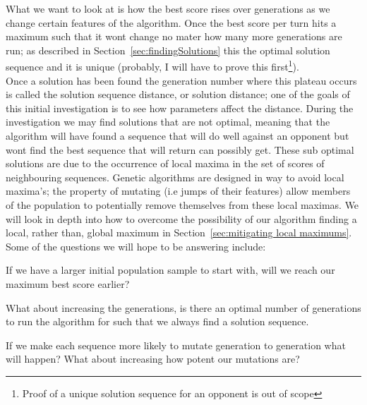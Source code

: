 
What we want to look at is how the best score rises over generations as we change certain features of the algorithm. 
Once the best score per turn hits a maximum such that it wont change no mater how many more generations are run; as described in Section~\ref{sec:findingSolutions} this the optimal solution sequence and it is unique (probably, I will have to prove this first\footnote{Proof of a unique solution sequence for an opponent is out of scope}).\\

Once a solution has been found the generation number where this plateau occurs is called the solution sequence distance, or solution distance; one of the goals of this initial investigation is to see how  parameters affect the distance.
During the investigation we may find solutions that are not optimal, meaning that the algorithm will have found a sequence that will do well against an opponent but wont find the best sequence that will return  can possibly get.
These sub optimal solutions are due to the occurrence of local maxima in the set of scores of neighbouring sequences. 
Genetic algorithms are designed in way to avoid local maxima's; the property of mutating (i.e jumps of their features) allow members of the population to potentially remove themselves from these local maximas. 
We will look in depth into how to overcome the possibility of our algorithm finding a local, rather than, global maximum in Section~\ref{sec:mitigating local maximums}.
Some of the questions we will hope to be answering include:
\begin{itemize}
    \begin{item}
        If we have a larger initial population sample to start with, will we reach our maximum best score earlier?
    \end{item}
    \begin{item}
        What about increasing the generations, is there an optimal number of generations to run the algorithm for such that we always find a solution sequence.
    \end{item}
    \begin{item}
        If we make each sequence more likely to mutate generation to generation what will happen? What about increasing how potent our mutations are?    
    \end{item}
\end{itemize}


